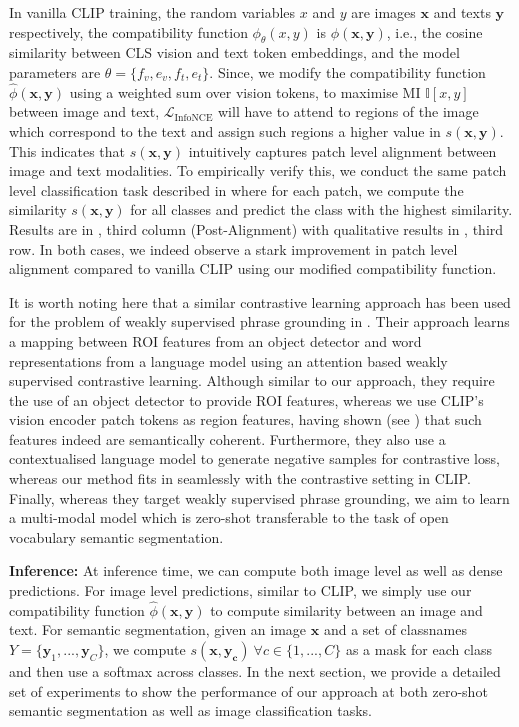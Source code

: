 \documentclass[10pt,twocolumn,letterpaper]{article}
\begin{document}
In vanilla CLIP training, the random variables $x$ and $y$ are images $\mathbf{x}$ and texts $\mathbf{y}$ respectively, the compatibility function $\phi_{\theta}(x, y)$ is $ \phi(\mathbf{x}, \mathbf{y})$, i.e., the cosine similarity between CLS vision and text token embeddings, and the model parameters are $\theta = \{f_v, e_v, f_t, e_t\}$.
Since, we modify the compatibility function $\hat{\phi}(\mathbf{x}, \mathbf{y})$ using a weighted sum over vision tokens, to maximise MI $\mathbb{I}[x, y]$ between image and text, $\mathcal{L}_{\mathrm{InfoNCE}}$ will have to attend to regions of the image which correspond to the text and assign such regions a higher value in $s(\mathbf{x}, \mathbf{y})$. This indicates that $s(\mathbf{x}, \mathbf{y})$ intuitively captures patch level alignment between image and text modalities. To empirically verify this, we conduct the same patch level classification task described in  where for each patch, we compute the similarity $s(\mathbf{x}, \mathbf{y})$ for all classes and predict the class with the highest similarity. Results are in , third column (Post-Alignment) with qualitative results in , third row. In both cases, we indeed observe a stark improvement in patch level alignment compared to vanilla CLIP using our modified compatibility function.

It is worth noting here that a similar contrastive learning approach has been used for the problem of weakly supervised phrase grounding in \cite{gupta2020contrastive}. Their approach learns a mapping between ROI features from an object detector and word representations from a language model using an attention based weakly supervised contrastive learning. Although similar to our approach, they require the use of an object detector to provide ROI features, whereas we use CLIP's vision encoder patch tokens as region features, having shown (see ) that such features indeed are semantically coherent. Furthermore, they also use a contextualised language model to generate negative samples for contrastive loss, whereas our method fits in seamlessly with the contrastive setting in CLIP. Finally, whereas they target weakly supervised phrase grounding, we aim to learn a multi-modal model which is zero-shot transferable to the task of open vocabulary semantic segmentation.

\textbf{Inference:} At inference time, we can compute both image level as well as dense predictions. For image level predictions, similar to CLIP, we simply use our compatibility function $\hat{\phi}(\mathbf{x}, \mathbf{y})$ to compute similarity between an image and text. For semantic segmentation, given an image $\mathbf{x}$ and a set of classnames $Y = \{\mathbf{y}_1, ..., \mathbf{y}_C\}$, we compute $s(\mathbf{x}, \mathbf{y_c}) {\ } \forall c \in \{1, ..., C\}$ as a mask for each class and then use a softmax across classes. In the next section, we provide a detailed set of experiments to show the performance of our approach at both zero-shot semantic segmentation as well as image classification tasks.
\end{document}
